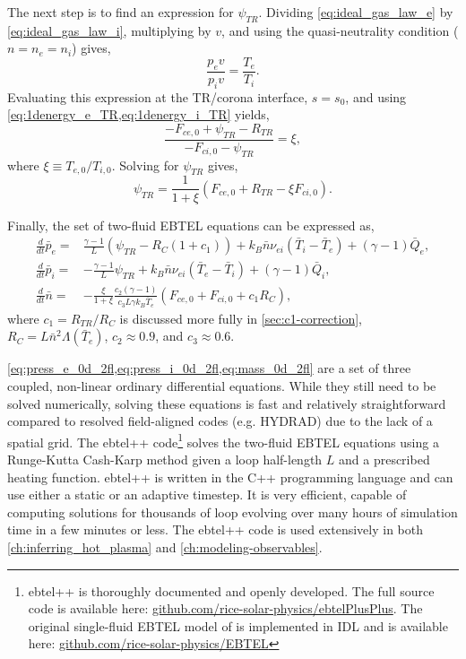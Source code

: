 The next step is to find an expression for $\psi_{TR}$. Dividing \autoref{eq:ideal_gas_law_e} by \autoref{eq:ideal_gas_law_i}, multiplying by $v$, and using the quasi-neutrality condition ($n=n_e=n_i$) gives,
\begin{equation}
    \frac{p_ev}{p_iv} = \frac{T_e}{T_i}.
\end{equation}
Evaluating this expression at the TR/corona interface, $s=s_0$, and using \cref{eq:1denergy_e_TR,eq:1denergy_i_TR} yields,
\begin{equation}
    \frac{- F_{ce,0} + \psi_{TR} - R_{TR}}{- F_{ci,0} - \psi_{TR}} = \xi,
\end{equation}
where $\xi\equiv T_{e,0}/T_{i,0}$. Solving for $\psi_{TR}$ gives,
\begin{equation}\label{eq:psi_TR}
    \psi_{TR} = \frac{1}{1+\xi}(F_{ce,0} + R_{TR} - \xi F_{ci,0}).
\end{equation}

Finally, the set of two-fluid EBTEL equations can be expressed as,
\begin{align}
    \frac{d}{dt}\bar{p}_e =& \frac{\gamma - 1}{L}(\psi_{TR} - R_C(1 + c_1)) + k_B\bar{n}\nu_{ei}(\bar{T}_i - \bar{T}_e) + (\gamma - 1)\bar{Q}_e,\label{eq:press_e_0d_2fl} \\
    \frac{d}{dt}\bar{p}_i =& -\frac{\gamma - 1}{L}\psi_{TR} + k_B\bar{n}\nu_{ei}(\bar{T}_e - \bar{T}_i) + (\gamma - 1)\bar{Q}_i,\label{eq:press_i_0d_2fl} \\
    \frac{d}{dt}\bar{n} =& -\frac{\xi}{1+\xi}\frac{c_2(\gamma - 1)}{c_3L\gamma k_B\bar{T}_e}(F_{ce,0} + F_{ci,0} + c_1R_C),\label{eq:mass_0d_2fl}
\end{align}
where $c_1=R_{TR}/R_C$ is discussed more fully in \autoref{sec:c1-correction}, $R_C=L\bar{n}^2\Lambda(\bar{T}_e)$, $c_2\approx0.9$, and $c_3\approx0.6$.

\cref{eq:press_e_0d_2fl,eq:press_i_0d_2fl,eq:mass_0d_2fl} are a set of three coupled, non-linear ordinary differential equations. While they still need to be solved numerically, solving these equations is fast and relatively straightforward compared to resolved field-aligned codes (e.g. HYDRAD) due to the lack of a spatial grid. The ebtel++ code\footnote{ebtel++ is thoroughly documented and openly developed. The full source code is available here: \href{https://github.com/rice-solar-physics/ebtelPlusPlus}{github.com/rice-solar-physics/ebtelPlusPlus}. The original single-fluid EBTEL model of \citet{klimchuk_highly_2008,cargill_enthalpy-based_2012} is implemented in IDL and is available here: \href{https://github.com/rice-solar-physics/EBTEL}{github.com/rice-solar-physics/EBTEL}} solves the two-fluid EBTEL equations using a Runge-Kutta Cash-Karp method \citep[Section 16.2]{press_numerical_1992} given a loop half-length $L$ and a prescribed heating function. ebtel++ is written in the C++ programming language and can use either a static or an adaptive timestep. It is very efficient, capable of computing solutions for thousands of loop evolving over many hours of simulation time in a few minutes or less. The ebtel++ code is used extensively in both \autoref{ch:inferring_hot_plasma} and \autoref{ch:modeling-observables}.


